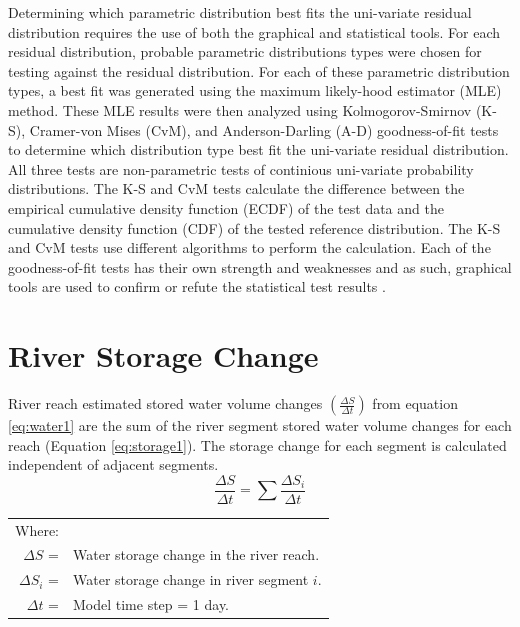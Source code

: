 Determining which parametric distribution best fits the uni-variate residual distribution requires the use of both the graphical and statistical tools.  For each residual distribution, probable parametric distributions types were chosen for testing against the residual distribution.  For each of these parametric distribution types, a best fit was generated using the maximum likely-hood estimator  (MLE) method.  These MLE results were then analyzed using Kolmogorov-Smirnov (K-S),  Cramer-von Mises (CvM), and Anderson-Darling (A-D) goodness-of-fit tests to determine which distribution type best fit the uni-variate residual distribution.  All three tests are non-parametric tests of continious uni-variate probability distributions.  The K-S and CvM tests calculate the difference between the empirical cumulative density function (ECDF) of the test data and the cumulative density function (CDF) of the tested reference distribution.  The K-S and CvM tests use different algorithms to perform the calculation.  Each of the goodness-of-fit tests has their own strength and weaknesses and as such, graphical tools are used to confirm or refute the statistical test results \parencite{delignette2014, venables2002, DAgostino1986}.

\clearpage{}
\section{River Storage Change}
\label{sec:RiverStorageChange}

River reach estimated stored water volume changes $( \frac{\Delta S}{\Delta t} ) $ from equation \ref{eq:water1} are the sum of the river segment stored water volume changes for each reach (Equation \ref{eq:storage1}).  The storage change for each segment is calculated independent of adjacent segments.
\begin{equation}
	\label{eq:storage1}
	\frac{\Delta S}{\Delta t} = \sum \frac{\Delta S_i}{\Delta t}
\end{equation}
\begin{tabular}{r p{5.5in}}
Where:\\
$\Delta S$ = & Water storage change in the river reach.\\
$\Delta S_i$ = & Water storage change in river segment $ i $.\\
$ \Delta t $ = & Model time step = 1 day. \\
\end{tabular}\\


